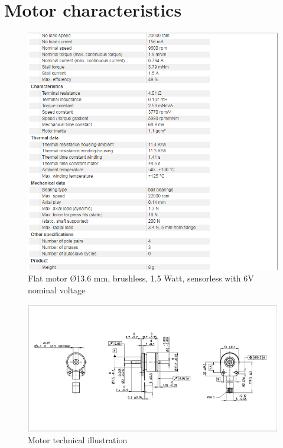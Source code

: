 \chapter{Motor characteristics}\label{chap: motorDatashit}
%
\begin{figure}[H]
	\centering
	\includegraphics[width=0.7\linewidth]{figures/motorchar}
	\caption{ Flat motor Ø13.6 mm, brushless, 1.5 Watt, sensorless with 6V nominal voltage}
	\label{fig:Flat Motor characteristics with Ø13.6 mm, brushless, 1.5 Watt, sensorless at 6V nominal voltage}
\end{figure}
%
\begin{figure}[H]
	\centering
	\includegraphics[width=0.7\linewidth]{figures/motor}
	\caption{Motor technical illustration}
	\label{fig:Motor technical illustration}
\end{figure}
